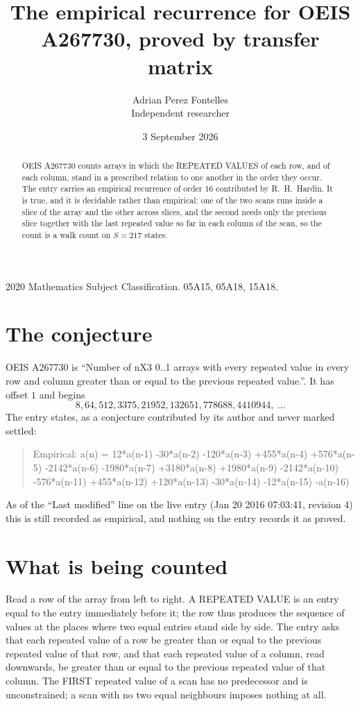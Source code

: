 \documentclass[11pt,a4paper]{article}
\title{The empirical recurrence for OEIS A267730, proved by transfer matrix}
\author{Adrian Perez Fontelles\\ \small Independent researcher}
\date{3 September 2026}
\theoremstyle{plain}
\theoremstyle{definition}
\begin{document}
\maketitle

\begin{abstract}
OEIS A267730 counts arrays in which the REPEATED VALUES of each row, and of each column, stand in a
prescribed relation to one another in the order they occur. The entry carries an empirical
recurrence of order $16$ contributed by R.~H.~Hardin. It is true, and it is decidable
rather than empirical: one of the two scans runs inside a slice of the array and the other
across slices, and the second needs only the previous slice together with the last repeated
value so far in each column of the scan, so the count is a walk count on $S=217$ states.
\end{abstract}

\noindent\small 2020 Mathematics Subject Classification. 05A15, 05A18, 15A18.\normalsize

\section{The conjecture}

OEIS A267730 is ``Number of nX3 0..1 arrays with every repeated value in every row and column greater than or equal to the previous repeated value.''. It has offset $1$ and begins
\[
8, 64, 512, 3375, 21952, 132651, 778688, 4410944,\ \dots
\]
The entry states, as a conjecture contributed by its author and never marked settled:
\begin{quote}
Empirical: a(n) = 12*a(n-1) -30*a(n-2) -120*a(n-3) +455*a(n-4) +576*a(n-5) -2142*a(n-6) -1980*a(n-7) +3180*a(n-8) +1980*a(n-9) -2142*a(n-10) -576*a(n-11) +455*a(n-12) +120*a(n-13) -30*a(n-14) -12*a(n-15) -a(n-16)
\end{quote}
As of the ``Last modified'' line on the live entry (Jan 20 2016 07:03:41, revision 4) this is still
recorded as empirical, and nothing on the entry records it as proved.

\section{What is being counted}

Read a row of the array from left to right. A REPEATED VALUE is an entry equal to the entry
immediately before it; the row thus produces the sequence of values at the places where two
equal entries stand side by side. The entry asks that each repeated value of a row be
greater than or equal to the previous repeated value of that row, and that each repeated value of a column,
read downwards, be greater than or equal to the previous repeated value of that column. The FIRST repeated
value of a scan has no predecessor and is unconstrained; a scan with no two equal neighbours
imposes nothing at all.
\end{document}

